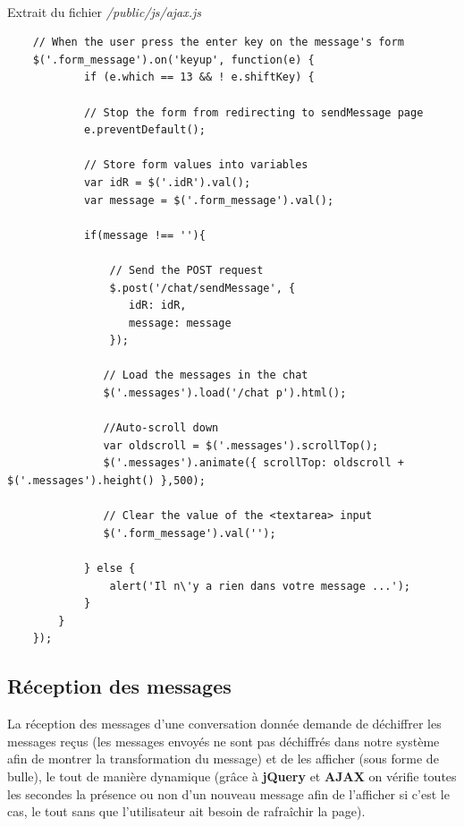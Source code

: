 \documentclass[12pt,a4paper]{report}
\begin{document}
\begin{itemize}
\paragraph{}

Extrait du fichier \textit{/public/js/ajax.js}

\lstset{}
\begin{lstlisting}
    // When the user press the enter key on the message's form
    $('.form_message').on('keyup', function(e) {
            if (e.which == 13 && ! e.shiftKey) {
            
            // Stop the form from redirecting to sendMessage page
            e.preventDefault();

            // Store form values into variables
            var idR = $('.idR').val();
            var message = $('.form_message').val();

            if(message !== ''){

                // Send the POST request
                $.post('/chat/sendMessage', {
                   idR: idR,
                   message: message
                });

               // Load the messages in the chat 
               $('.messages').load('/chat p').html();

               //Auto-scroll down
               var oldscroll = $('.messages').scrollTop();
               $('.messages').animate({ scrollTop: oldscroll + $('.messages').height() },500);

               // Clear the value of the <textarea> input
               $('.form_message').val('');

            } else {
                alert('Il n\'y a rien dans votre message ...');
            }
        }
    });
\end{lstlisting}

\subsection{Réception des messages}
La réception des messages d'une conversation donnée demande de déchiffrer les messages reçus (les messages envoyés ne sont pas déchiffrés dans notre système afin de montrer la transformation du message) et de les afficher (sous forme de bulle), le tout de manière dynamique (grâce à \textbf{jQuery} et \textbf{AJAX} on vérifie toutes les secondes la présence ou non d'un nouveau message afin de l'afficher si c'est le cas, le tout sans que l'utilisateur ait besoin de rafraîchir la page).

\end{itemize}
\end{document}

